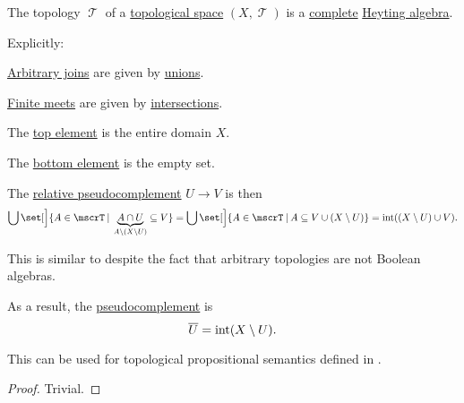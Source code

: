 \begin{proposition}\label{thm:topology_is_heyting_algebra}
  The topology \( \mscrT \) of a \hyperref[def:topological_space]{topological space} \( (X, \mscrT) \) is a \hyperref[def:complete_lattice]{complete} \hyperref[def:heyting_algebra]{Heyting algebra}.

  Explicitly:
  \begin{thmenum}
     \hyperref[def:lattice/join]{Arbitrary joins} are given by \hyperref[def:basic_set_operations/union]{unions}.

     \hyperref[def:lattice/meet]{Finite meets} are given by \hyperref[def:basic_set_operations/intersection]{intersections}.

     The \hyperref[def:extremal_points/top_and_bottom]{top element} is the entire domain \( X \).

     The \hyperref[def:extremal_points/top_and_bottom]{bottom element} is the empty set.

     The \hyperref[def:heyting_algebra]{relative pseudocomplement} \( U \rightarrow V \) is then
    \begin{equation*}
      \bigcup\set[\Big]{ A \in \mscrT \given \underbrace{A \cap U}_{A \setminus (X \setminus U)} \subseteq V }
      =
      \bigcup\set[\Big]{ A \in \mscrT \given A \subseteq V \cup (X \setminus U) }
      =
      \Int((X \setminus U) \cup V).
    \end{equation*}

    This is similar to  despite the fact that arbitrary topologies are not Boolean algebras.

     As a result, the \hyperref[def:heyting_algebra/pseudocomplement]{pseudocomplement} is
    \begin{equation*}
      \oline U = \Int(X \setminus U).
    \end{equation*}
  \end{thmenum}
\end{proposition}
\begin{comments}
  \item This can be used for topological propositional semantics defined in .
\end{comments}
\begin{proof}
  Trivial.
\end{proof}


